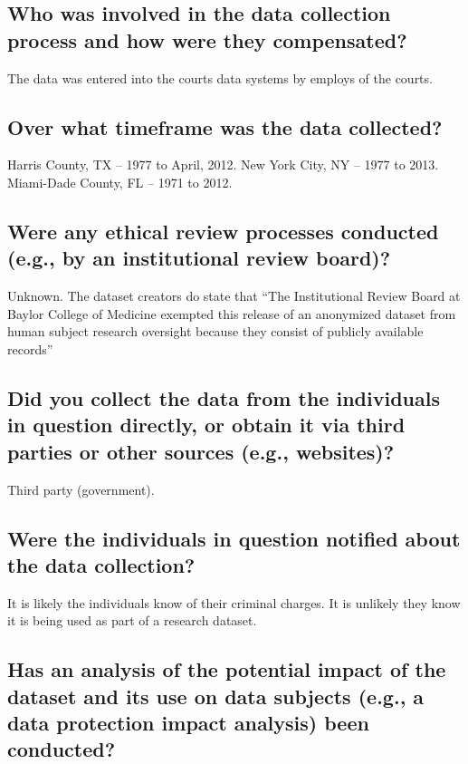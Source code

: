 \documentclass[letterpaper, 10 pt, conference]{ieeeconf}  %
\begin{document}
\subsection{Who was involved in the data collection process and how were they compensated?}

The data was entered into the courts data systems by employs of the courts. 

\subsection{Over what timeframe was the data collected?}

Harris County, TX -- 1977 to April, 2012. 
New York City, NY -- 1977 to 2013.
Miami-Dade County, FL -- 1971 to 2012.

\subsection{Were any ethical review processes conducted (e.g., by an institutional review board)?}

Unknown. The dataset creators do state that ``The Institutional Review
Board at Baylor College of Medicine exempted this
release of an anonymized dataset from human subject
research oversight because they consist of publicly
available records''

\subsection{Did you collect the data from the individuals in question directly, or obtain it via third parties or other sources (e.g., websites)?}

Third party (government).

\subsection{Were the individuals in question notified about the data collection?}

It is likely the individuals know of their criminal charges. It is unlikely they know it is being used as part of a research dataset. 

\subsection{Has an analysis of the potential impact of the dataset and its use on data subjects (e.g., a data protection impact analysis) been conducted?}
\end{document}
